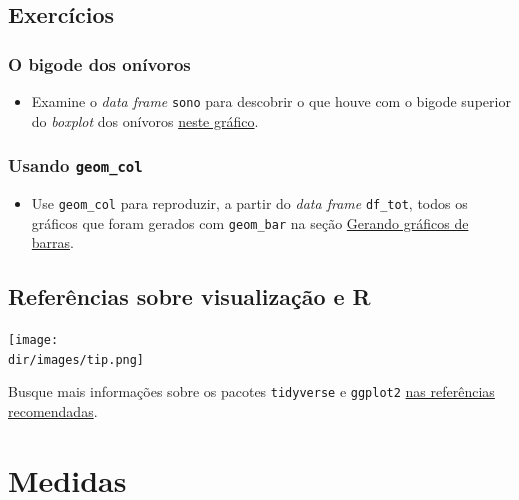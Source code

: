 \documentclass[
  11pt]{report}
\providecommand{\tightlist}{%
  \setlength{\itemsep}{0pt}\setlength{\parskip}{0pt}}
\newcommand{\dir}{/ssd/R/x86_64-pc-linux-gnu-library/4.3/fnaufelRmd/rmarkdown/resources}
\newenvironment{rmdtip}
{
  \begin{mytip}
    \texttt{[image: \\dir/images/tip.png]}
    \tcblower
  }
  {
  \end{mytip}
}
\begin{document}
\hypertarget{exercuxedcios-6}{%
\section{Exercícios}\label{exercuxedcios-6}}

\hypertarget{o-bigode-dos-onuxedvoros}{%
\subsection{O bigode dos onívoros}\label{o-bigode-dos-onuxedvoros}}

\begin{itemize}
\tightlist
\item
  Examine o \emph{data frame} \texttt{sono} para descobrir o que houve com o bigode superior do \emph{boxplot} dos onívoros \protect\hyperlink{onivoros}{neste gráfico}.
\end{itemize}

\hypertarget{usando-geom_col}{%
\subsection{\texorpdfstring{Usando \texttt{geom\_col}}{Usando geom\_col}}\label{usando-geom_col}}

\begin{itemize}
\tightlist
\item
  Use \texttt{geom\_col} para reproduzir, a partir do \emph{data frame} \texttt{df\_tot}, todos os gráficos que foram gerados com \texttt{geom\_bar} na seção \protect\hyperlink{gerando-grux5cux25C3ux5cux25A1ficos-de-barras}{Gerando gráficos de barras}.
\end{itemize}

\hypertarget{referuxeancias-sobre-visualizauxe7uxe3o-e-r}{%
\section{Referências sobre visualização e R}\label{referuxeancias-sobre-visualizauxe7uxe3o-e-r}}

\begin{rmdtip}
Busque mais informações sobre os pacotes \texttt{tidyverse} e \texttt{ggplot2} \protect\hyperlink{refrec}{nas referências recomendadas}.

\end{rmdtip}

\hypertarget{medidas}{%
\chapter{Medidas}\label{medidas}}
\end{document}
